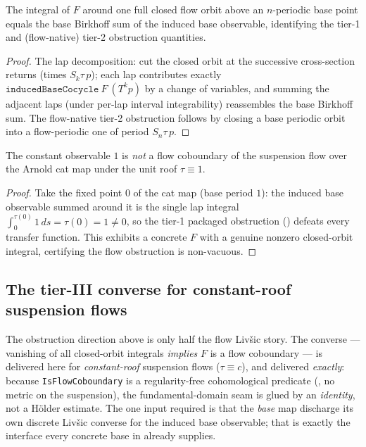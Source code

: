 \begin{theorem}\label{thm:livsic-lap-bridge}
  \leanok
  The integral of \(F\) around one full closed flow orbit above an \(n\)-periodic base point equals
  the base Birkhoff sum of the induced base observable, identifying the tier-1 and (flow-native)
  tier-2 obstruction quantities.
\end{theorem}
\begin{proof}\leanok
  The lap decomposition: cut the closed orbit at the successive cross-section returns
  (times \(S_k\tau\,p\)); each lap contributes exactly \(\texttt{inducedBaseCocycle}\ F\ (T^k p)\) by
  a change of variables, and summing the adjacent laps (under per-lap interval integrability)
  reassembles the base Birkhoff sum. The flow-native tier-2 obstruction
  follows by closing a base periodic orbit into a flow-periodic one of period \(S_n\tau\,p\).
\end{proof}

\begin{theorem}\label{thm:livsic-cat-suspension}
  \leanok
  The constant observable \(1\) is \emph{not} a flow coboundary of the suspension flow over the
  Arnold cat map under the unit roof \(\tau\equiv 1\).
\end{theorem}
\begin{proof}\leanok
  Take the fixed point \(0\) of the cat map (base period \(1\)): the induced base observable summed
  around it is the single lap integral \(\int_0^{\tau(0)} 1\,ds = \tau(0) = 1\ne 0\), so the tier-1
  packaged obstruction () defeats every transfer function. This exhibits
  a concrete \(F\) with a genuine nonzero closed-orbit integral, certifying the flow obstruction is
  non-vacuous.
\end{proof}

\subsection{The tier-III converse for constant-roof suspension flows}

The obstruction direction above is only half the flow Livšic story. The converse --- vanishing of
all closed-orbit integrals \emph{implies} \(F\) is a flow coboundary --- is delivered here for
\emph{constant-roof} suspension flows (\(\tau\equiv c\)), and delivered \emph{exactly}: because
\texttt{IsFlowCoboundary} is a regularity-free cohomological predicate (, no
metric on the suspension), the fundamental-domain seam is glued by an \emph{identity}, not a Hölder
estimate. The one input required is that the \emph{base} map discharge its own discrete Livšic
converse for the induced base observable; that is exactly the interface every concrete base in
 already supplies.

